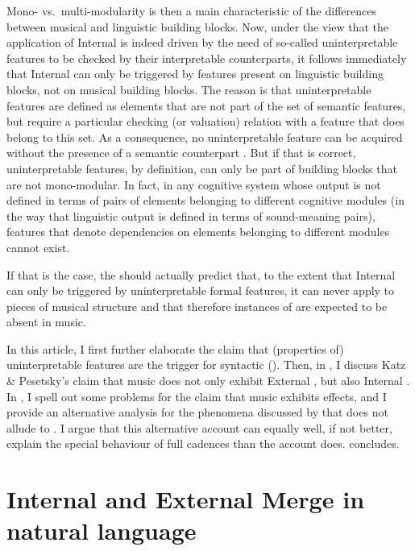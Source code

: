 \documentclass[output=paper]{langsci/langscibook}
\begin{document}
Mono- vs.\ multi-modularity is then a main characteristic of the differences
between musical and linguistic building blocks. Now, under the view that the
application of Internal  is indeed driven by the need of so-called
uninterpretable features to be checked by their interpretable counterparts, it
follows immediately that Internal  can only be triggered by features
present on linguistic building blocks, not on musical building blocks. The
reason is that uninterpretable features are defined as elements that are not
part of the set of semantic features, but require a particular checking (or
valuation) relation with a feature that does belong to this set. As a
consequence, no uninterpretable feature can be acquired without the presence of
a semantic counterpart
\parencite[see][]{Brody1997,Svenonius2007,Zeijlstra2008,Zeijlstra2012}. But if
that is correct, uninterpretable features, by definition, can only be part of
building blocks that are not mono-modular. In fact, in any cognitive system
whose output is not defined in terms of pairs of elements belonging to
different cognitive modules (in the way that linguistic output is defined in
terms of sound-meaning pairs), features that denote dependencies on elements
belonging to different modules cannot exist.

If that is the case, the  should
actually predict that, to the extent that Internal  can only be
triggered by uninterpretable formal features, it can never apply to pieces of
musical structure and that therefore instances of  are expected to be
absent in music.

In this article, I first further elaborate the claim that (properties of)
uninterpretable features are the trigger for syntactic 
(). Then, in , I discuss Katz \&
Pesetsky’s claim that music does not only exhibit External , but
also Internal . In , I spell out some problems
for the claim that music exhibits  effects, and I provide an
alternative analysis for the phenomena discussed by \citeauthor{KatzPes2011}
that does not allude to . I argue that this alternative account can
equally well, if not better, explain the special behaviour of full cadences
than the  account does.   concludes.

\section{Internal and External Merge in natural language}\label{sec:26.2}
\end{document}
